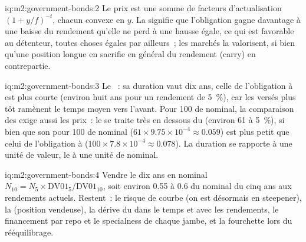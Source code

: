 \begin{solution}{iq:m2:government-bonds:2}
Le prix est une somme de facteurs d'actualisation $(1 + y/f)^{-t}$, chacun convexe en $y$.
La  signifie que l'obligation gagne davantage à une baisse du rendement qu'elle ne perd à une
hausse égale, ce qui est favorable au détenteur, toutes choses égales par ailleurs~; les marchés la valorisent,
si bien qu'une position longue en  sacrifie en général du rendement (carry) en contrepartie.
\end{solution}

\begin{solution}{iq:m2:government-bonds:3}
Le ~: sa duration vaut dix ans, celle de l'obligation à  est plus courte (environ
huit ans pour un rendement de 5~\%), car les  versés plus tôt ramènent le temps moyen vers l'avant.
Pour 100 de nominal, la comparaison des  exige aussi les prix~: le  se traite
très en dessous du  (environ 61 à 5~\%), si bien que son  pour 100 de nominal ($61 \times 9.75 \times
10^{-4} \approx 0.059$) est plus petit que celui de l'obligation à  ($100 \times 7.8 \times
10^{-4} \approx 0.078$). La duration se rapporte à une unité de valeur, le  à une unité de nominal.
\end{solution}

\begin{solution}{iq:m2:government-bonds:4}
Vendre le dix ans en nominal $N_{10} = N_5 \times \mathrm{DV01}_5/\mathrm{DV01}_{10}$,
soit environ 0.55 à 0.6 du nominal du cinq ans aux rendements actuels. Restent~:
le risque de courbe (on est désormais en steepener), la  (position vendeuse), la dérive du  dans le temps
et avec les rendements, le financement par repo et le specialness de chaque jambe, et la
fourchette lors du rééquilibrage.
\end{solution}


